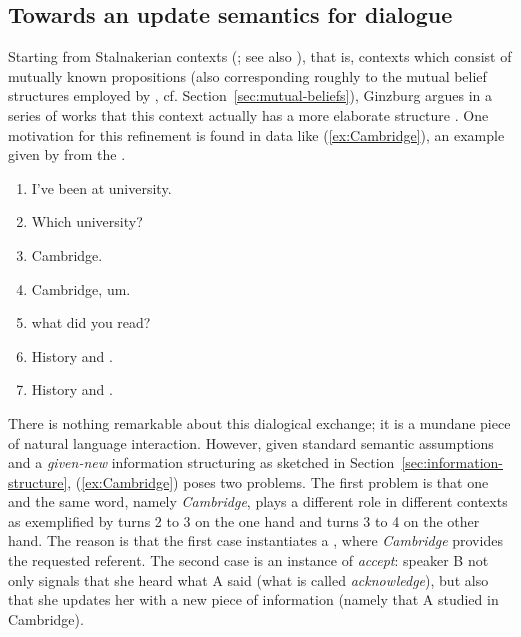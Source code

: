 \documentclass[output=paper
 	        ,biblatex
                ,babelshorthands
                ,newtxmath
                ,draftmode
                ,colorlinks, citecolor=brown
]{langscibook}
\begin{document}
\subsection{Towards an update semantics for dialogue}
\label{sec:dialogue-game-boards}

Starting from Stalnakerian contexts  (\citealp{Stalnaker:1978}; see also \citealp{Lewis:1979:b}), that is, contexts which consist of mutually known propositions (also corresponding roughly to the mutual belief structures employed by \citealp{Green:1996}, cf. Section~\ref{sec:mutual-beliefs}), Ginzburg argues in a series of works that this context actually has a more elaborate structure \citep{Ginzburg:1994,Ginzburg:1996,Ginzburg:1997}.
%
One motivation for this refinement is found in data like (\ref{ex:Cambridge}), an
example given by \citet[]{Ginzburg:1994} from the  \citep{Svartvik:1990}.
%
\ea \label{ex:Cambridge}
\begin{enumerate}[noitemsep]
\item {} I've been at university.
\item {} Which university?
\item {} Cambridge.
\item {} Cambridge, um.
\item \speaking{} what did you read?
\item {} History and .
\item {} History and .
\end{enumerate}
\z

There is nothing remarkable about this dialogical exchange; it is a mundane piece of natural language interaction.
%
However, given standard semantic assumptions and a \emph{given-new} information structuring as sketched in Section~\ref{sec:information-structure}, (\ref{ex:Cambridge}) poses two problems.
%
The first problem is that one and the same word, namely \textit{Cambridge}, plays a different role in different contexts as exemplified by turns 2 to 3 on the one hand and turns 3 to 4 on the other hand.
%
The reason is that the first case instantiates a , where \textit{Cambridge} provides the requested referent.
%
The second case is an instance of \emph{accept}:  speaker B not only signals that she heard what A said (what is called \emph{acknowledge}),  but also that she updates  her  with a new piece of information (namely that A studied in Cambridge).
\end{document}
